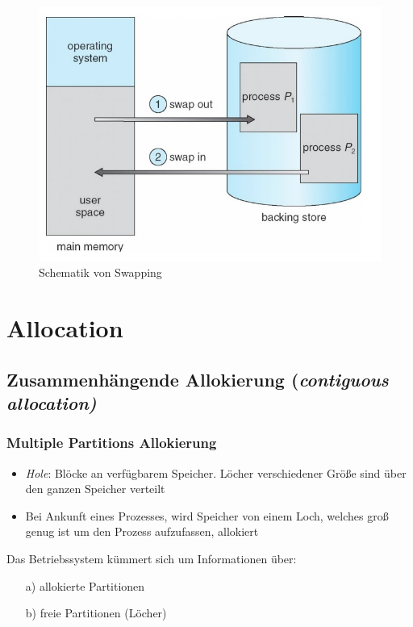 \documentclass[a4paper]{scrreprt}
\begin{document}
\begin{figure}[ht]
\centering
\includegraphics[scale=0.6]{graphics/swapping.png}
\caption{Schematik von Swapping}
\end{figure}

\section{Allocation}
\subsection{Zusammenhängende Allokierung (\textit{contiguous allocation)}}
\subsubsection{Multiple Partitions Allokierung}
\begin{itemize}
\item \textit{Hole}: Blöcke an verfügbarem Speicher. Löcher verschiedener Größe sind über den ganzen Speicher verteilt
\item Bei Ankunft eines Prozesses, wird Speicher von einem Loch, welches groß genug ist um den Prozess aufzufassen, allokiert
\end{itemize} Das Betriebssystem kümmert sich um Informationen über:

\begin{itemize}
\item[a)] allokierte Partitionen
\item[b)] freie Partitionen (Löcher)
\end{itemize}
\end{document}
